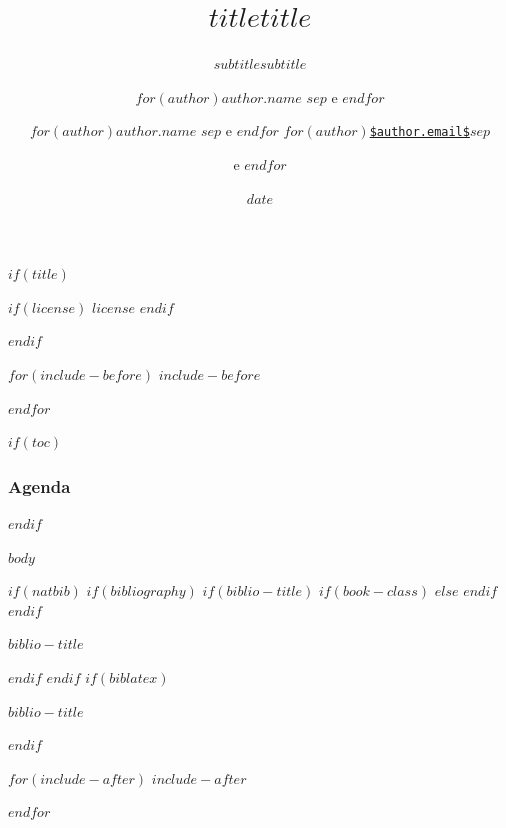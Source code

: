 \documentclass[$if(fontsize)$$fontsize$,$endif$$if(lang)$$babel-lang$,$endif$$if(handout)$handout,$endif$$if(beamer)$ignorenonframetext,$endif$$for(classoption)$$classoption$$sep$,$endfor$]{$documentclass$}
\title[$idsubjectcourseinstitution$ -- v.$version$]{\texttt{$title$}}
\subtitle{\emph{$subtitle$}}
\author[
$for(author)$\tiny $author.citation$$sep$ e $endfor$
] %
{
$for(author)$\small \textbf{$author.name$}\footnotesize\inst{$author.id$}\vspace{0.05in} $sep$ e $endfor$
\vspace{-0.5cm}
}
\institute[]{
\normalsize
$for(author)$
\inst{$author.id$}%
\footnotesize\emph{$author.affiliation$ \\ $author.department$ \\ $author.citystatecountry$} \newline \url{$author.email$}\vspace*{0.05in} $sep$ \and
\vspace{-0.3cm}
$endfor$
$if(coursename)$
\\ \textbf{$coursename$} \newline \texttt{$subjectname$}
$endif$
}
\date[$date$]{}
\date[\today]{}
\title[$idsubjectcourseinstitution$ - $classnumber$ - v.$version$] %
{\LARGE $title$}
\subtitle{\Large $subtitle$}
\author[
$for(author)$\tiny $author.citation$$sep$ e $endfor$
] %
{
$for(author)$\normalsize {$author.name$}\footnotesize\inst{$author.id$}\vspace{0.05in} $sep$ e $endfor$
\vspace{-0.2cm}
\newline
$for(author)$\normalsize\href{mailto:$author.email$}{\nolinkurl{$author.email$}}$sep$ \and e $endfor$
}
\institute[UTFPR]{
\normalsize
$for(author)$
\inst{$author.id$}%
\footnotesize{\vspace{-0.15cm}$author.affiliation$ \\ \vspace{-0.15cm} $author.department$ \\ \vspace{-0.15cm} $author.citystatecountry$} $sep$ \and
\vspace{-0.3cm}
$endfor$
\and
$if(coursename)$
\textbf{$coursename$}
\vspace{-0.1cm}
\\ $subjectname$
\vspace{0.5cm}
$endif$
}
\date[$date$]{$date$}
\date[\today]{}
\newif\ifbibliography
\begin{document}

$if(title)$
\begin{frame}[plain]
  \titlepage
  $if(license)$
  $license$
  $endif$
\end{frame}
$endif$

$for(include-before)$
$include-before$

$endfor$

$if(toc)$
\begin{frame}
\frametitle{Agenda}
\tableofcontents[hideallsubsections]
\end{frame}
$endif$

$body$

$if(natbib)$
$if(bibliography)$
$if(biblio-title)$
$if(book-class)$
\renewcommand\bibname{$biblio-title$}
$else$
\renewcommand\refname{$biblio-title$}
$endif$
$endif$
\begin{frame}{$biblio-title$}
\bibliographytrue

\end{frame}

$endif$
$endif$
$if(biblatex)$
\begin{frame}{$biblio-title$}
\bibliographytrue
\printbibliography[heading=none]
\end{frame}

$endif$

$for(include-after)$
$include-after$

$endfor$
\end{document}
